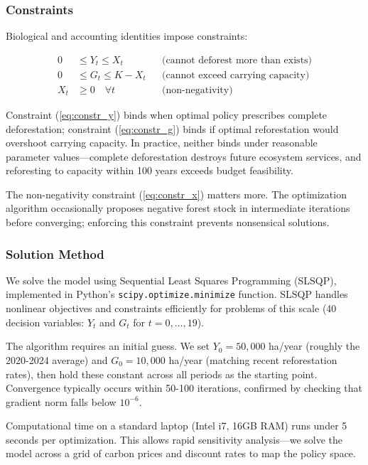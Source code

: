 \subsubsection{Constraints}

Biological and accounting identities impose constraints:

\begin{align}
0 &\leq Y_t \leq X_t && \text{(cannot deforest more than exists)} \label{eq:constr_y} \\
0 &\leq G_t \leq K - X_t && \text{(cannot exceed carrying capacity)} \label{eq:constr_g} \\
X_t &\geq 0 \quad \forall t && \text{(non-negativity)} \label{eq:constr_x}
\end{align}

Constraint (\ref{eq:constr_y}) binds when optimal policy prescribes complete deforestation; constraint (\ref{eq:constr_g}) binds if optimal reforestation would overshoot carrying capacity. In practice, neither binds under reasonable parameter values—complete deforestation destroys future ecosystem services, and reforesting to capacity within 100 years exceeds budget feasibility.

The non-negativity constraint (\ref{eq:constr_x}) matters more. The optimization algorithm occasionally proposes negative forest stock in intermediate iterations before converging; enforcing this constraint prevents nonsensical solutions.

\subsubsection{Solution Method}

We solve the model using Sequential Least Squares Programming (SLSQP), implemented in Python's \texttt{scipy.optimize.minimize} function. SLSQP handles nonlinear objectives and constraints efficiently for problems of this scale (40 decision variables: $Y_t$ and $G_t$ for $t = 0, \ldots, 19$).

The algorithm requires an initial guess. We set $Y_0 = 50,000$ ha/year (roughly the 2020-2024 average) and $G_0 = 10,000$ ha/year (matching recent reforestation rates), then hold these constant across all periods as the starting point. Convergence typically occurs within 50-100 iterations, confirmed by checking that gradient norm falls below $10^{-6}$.

Computational time on a standard laptop (Intel i7, 16GB RAM) runs under 5 seconds per optimization. This allows rapid sensitivity analysis—we solve the model across a grid of carbon prices and discount rates to map the policy space.

